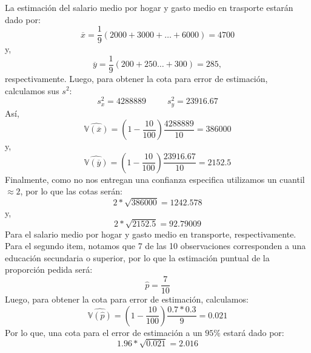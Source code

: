 \begin{solution}
La estimación del salario medio por hogar y gasto medio en trasporte estarán dado por:
$$\overline{x}=\dfrac{1}{9}\left(2000+3000+\dots+6000\right)=4700$$
y,
$$\overline{y}=\dfrac{1}{9}\left(200+250\dots+300\right)=285,$$
respectivamente.
Luego, para obtener la cota para error de estimación, calculamos sus $s^2$:
$$s_{x}^{2}=4288889 \hspace{30pt} s_{y}^{2}=23916.67$$
Así, 
$$\widehat{\mathbb{V}(\overline{x})}=\left(1-\dfrac{10}{100}\right)\dfrac{4288889}{10}=386000$$
y,
$$\widehat{\mathbb{V}(\overline{y})}=\left(1-\dfrac{10}{100}\right)\dfrac{23916.67}{10}=2152.5$$
Finalmente, como no nos entregan una confianza especifica utilizamos un cuantil $\approx 2$, por lo que las cotas serán:
$$2*\sqrt{386000}=1242.578$$
y,
$$2*\sqrt{2152.5}=92.79009$$
Para el salario medio por hogar y gasto medio en transporte, respectivamente.\\

Para el segundo item, notamos que 7 de las 10 observaciones corresponden a una educación secundaria o superior, por lo que la estimación puntual de la proporción pedida será:
$$\hat{p}=\dfrac{7}{10}$$
Luego, para obtener la cota para error de estimación, calculamos: 
$$\widehat{\mathbb{V}(\hat{p})}=\left(1-\dfrac{10}{100}\right)\dfrac{0.7*0.3}{9}=0.021$$
Por lo que, una cota para el error de estimación a un $95\%$ estará dado por:
$$1.96*\sqrt{0.021}=2.016$$
\end{solution}